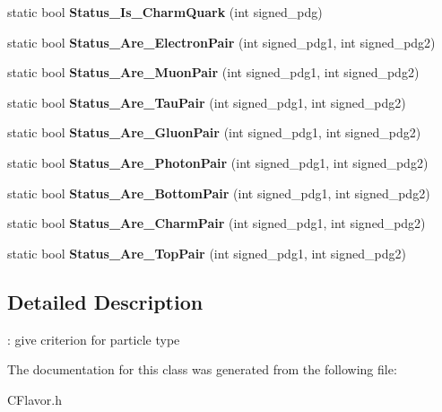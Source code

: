 \begin{DoxyCompactItemize}
\item 
\hypertarget{classToolSet_1_1CFlavor_a7dff55be1df93713579865e918e4f006}{
static bool {\bfseries Status\_\-Is\_\-CharmQuark} (int signed\_\-pdg)}
\label{classToolSet_1_1CFlavor_a7dff55be1df93713579865e918e4f006}

\item 
\hypertarget{classToolSet_1_1CFlavor_a3be3ffadd51336a99f13c535935581ae}{
static bool {\bfseries Status\_\-Are\_\-ElectronPair} (int signed\_\-pdg1, int signed\_\-pdg2)}
\label{classToolSet_1_1CFlavor_a3be3ffadd51336a99f13c535935581ae}

\item 
\hypertarget{classToolSet_1_1CFlavor_abc59b6968684d21d0de2aa5b493fcc9b}{
static bool {\bfseries Status\_\-Are\_\-MuonPair} (int signed\_\-pdg1, int signed\_\-pdg2)}
\label{classToolSet_1_1CFlavor_abc59b6968684d21d0de2aa5b493fcc9b}

\item 
\hypertarget{classToolSet_1_1CFlavor_a2050b271f8677852eba2296a9659a10a}{
static bool {\bfseries Status\_\-Are\_\-TauPair} (int signed\_\-pdg1, int signed\_\-pdg2)}
\label{classToolSet_1_1CFlavor_a2050b271f8677852eba2296a9659a10a}

\item 
\hypertarget{classToolSet_1_1CFlavor_aafeac0eba956b819920b2eb5c9b849b1}{
static bool {\bfseries Status\_\-Are\_\-GluonPair} (int signed\_\-pdg1, int signed\_\-pdg2)}
\label{classToolSet_1_1CFlavor_aafeac0eba956b819920b2eb5c9b849b1}

\item 
\hypertarget{classToolSet_1_1CFlavor_aebbfa1ed752fc217555c584be39a92e7}{
static bool {\bfseries Status\_\-Are\_\-PhotonPair} (int signed\_\-pdg1, int signed\_\-pdg2)}
\label{classToolSet_1_1CFlavor_aebbfa1ed752fc217555c584be39a92e7}

\item 
\hypertarget{classToolSet_1_1CFlavor_a8eff5f52b9dd22470557f204118e2386}{
static bool {\bfseries Status\_\-Are\_\-BottomPair} (int signed\_\-pdg1, int signed\_\-pdg2)}
\label{classToolSet_1_1CFlavor_a8eff5f52b9dd22470557f204118e2386}

\item 
\hypertarget{classToolSet_1_1CFlavor_a9b8f8be27a7dee97064ee3cc947ad863}{
static bool {\bfseries Status\_\-Are\_\-CharmPair} (int signed\_\-pdg1, int signed\_\-pdg2)}
\label{classToolSet_1_1CFlavor_a9b8f8be27a7dee97064ee3cc947ad863}

\item 
\hypertarget{classToolSet_1_1CFlavor_abc636cde8cbdf3e5789a962274ff1c89}{
static bool {\bfseries Status\_\-Are\_\-TopPair} (int signed\_\-pdg1, int signed\_\-pdg2)}
\label{classToolSet_1_1CFlavor_abc636cde8cbdf3e5789a962274ff1c89}

\end{DoxyCompactItemize}


\subsection{Detailed Description}
: give criterion for particle type 

The documentation for this class was generated from the following file:\begin{DoxyCompactItemize}
\item 
CFlavor.h\end{DoxyCompactItemize}
